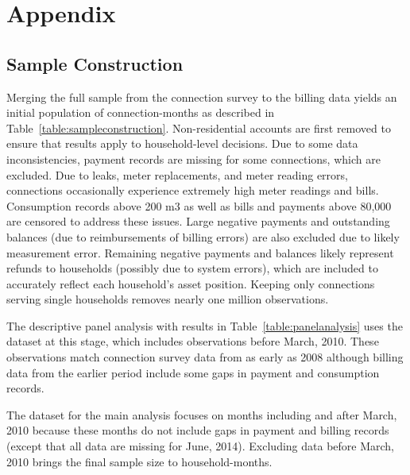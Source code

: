 \documentclass[12pt,table]{article}
\begin{document}
\pagebreak

\section{Appendix}



\subsection{Sample Construction}\label{appendix:sampleconstruction}

Merging the full sample from the connection survey to the billing data yields an initial population of connection-months as described in Table~\ref{table:sampleconstruction}.  Non-residential accounts are first removed to ensure that results apply to household-level decisions.  Due to some data inconsistencies, payment records are missing for some connections, which are excluded.  Due to leaks, meter replacements, and meter reading errors, connections occasionally experience extremely high meter readings and bills.  Consumption records above 200 m3 as well as bills and payments above 80,000 are censored to address these issues.  Large negative payments and outstanding balances (due to reimbursements of billing errors) are also excluded due to likely measurement error.  Remaining negative payments and balances likely represent refunds to households (possibly due to system errors), which are included to accurately reflect each household's asset position.  Keeping only connections serving single households removes nearly one million observations.

The descriptive panel analysis with results in Table~\ref{table:panelanalysis} uses the dataset at this stage, which includes observations before March, 2010.  These observations match connection survey data from as early as 2008 although billing data from the earlier period include some gaps in payment and consumption records.

The dataset for the main analysis focuses on months including and after March, 2010 because these months do not include gaps in payment and billing records (except that all data are missing for June, 2014).  Excluding data before March, 2010 brings the final sample size to household-months.

\end{document}

